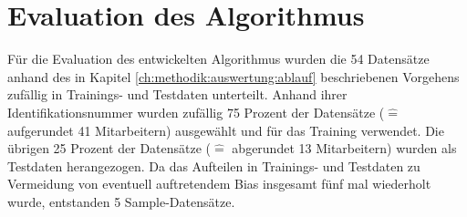 

\section{Evaluation des Algorithmus}
Für die Evaluation des entwickelten Algorithmus wurden die 54 Datensätze anhand des in Kapitel \ref{ch:methodik:auswertung:ablauf} beschriebenen Vorgehens zufällig in Trainings- und Testdaten unterteilt.
Anhand ihrer Identifikationsnummer wurden zufällig 75 Prozent der Datensätze ($\hat{=}$ aufgerundet 41 Mitarbeitern) ausgewählt und für das Training verwendet.
Die übrigen 25 Prozent der Datensätze ($\hat{=}$ abgerundet 13 Mitarbeitern) wurden als Testdaten herangezogen.
Da das Aufteilen in Trainings- und Testdaten zu Vermeidung von eventuell auftretendem Bias insgesamt fünf mal wiederholt wurde, entstanden 5 Sample-Datensätze.


